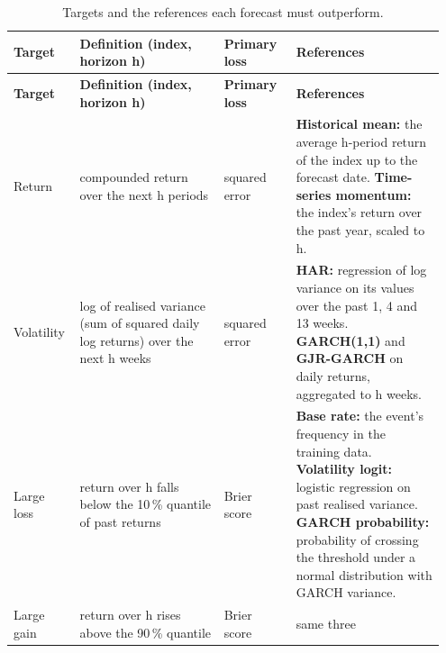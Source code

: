 {\scriptsize\setlength{\tabcolsep}{4pt}\renewcommand{\arraystretch}{1.2}
\begin{longtable}{@{}>{\raggedright\arraybackslash}p{0.134\linewidth}>{\raggedright\arraybackslash}p{0.324\linewidth}>{\raggedright\arraybackslash}p{0.162\linewidth}>{\raggedright\arraybackslash}p{0.333\linewidth}@{}}
\caption{Targets and the references each forecast must outperform.}\label{tab:2}\\
\toprule
\textbf{Target} & \textbf{Definition (index, horizon h)} & \textbf{Primary loss} & \textbf{References} \\
\midrule
\endfirsthead
\toprule
\textbf{Target} & \textbf{Definition (index, horizon h)} & \textbf{Primary loss} & \textbf{References} \\
\midrule
\endhead
\bottomrule
\endlastfoot
Return & compounded return over the next h periods & squared error & \textbf{Historical mean:} the average h-period return of the index up to the forecast date. \textbf{Time-series momentum:} the index's return over the past year, scaled to h. \\
Volatility & log of realised variance (sum of squared daily log returns) over the next h weeks & squared error & \textbf{HAR:} regression of log variance on its values over the past 1, 4 and 13 weeks. \textbf{GARCH(1,1)} and \textbf{GJR-GARCH} on daily returns, aggregated to h weeks. \\
Large loss & return over h falls below the 10\,\% quantile of past returns & Brier score & \textbf{Base rate:} the event's frequency in the training data. \textbf{Volatility logit:} logistic regression on past realised variance. \textbf{GARCH probability:} probability of crossing the threshold under a normal distribution with GARCH variance. \\
Large gain & return over h rises above the 90\,\% quantile & Brier score & same three \\
\end{longtable}}
